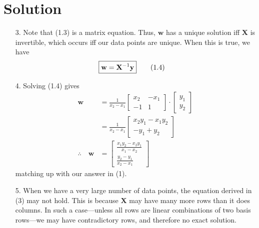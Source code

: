 \documentclass{harvardml}
\theoremstyle{definition}
\theoremstyle{plain}
\newenvironment{solution}
  {\color{blue}\section*{Solution}}
{}
\begin{document}
\begin{solution}
\begin{enumerate}
    \item[3.] Note that (1.3) is a matrix equation. Thus, $\mathbf{w}$ has a unique solution iff $\mathbf{X}$ is invertible, which occurs iff our data points are unique. When this is true, we have
    \begin{align*}
        \Aboxed{ \mathbf{w} &= \mathbf{X}^{-1} \mathbf{y} } \tag*{(1.4)}
    \end{align*}


    \item[4.] Solving (1.4) gives
    \begin{align*}
        \mathbf{w} &= \frac{1}{x_2 - x_1} \begin{bmatrix}
            x_2 & -x_1 \\
            -1 & 1
        \end{bmatrix} \cdot \begin{bmatrix}
            y_1 \\
            y_2
        \end{bmatrix} \\
        &= \frac{1}{x_2 - x_1} \begin{bmatrix}
            x_2y_1 -x_1y_2 \\
            -y_1 + y_2
        \end{bmatrix} \\
        \therefore \quad \mathbf{w} &= \begin{bmatrix}
            \frac{ x_1y_2 - x_2y_1 }{x_1 - x_2} \\
            \frac{y_2 - y_1}{x_2 - x_1}
        \end{bmatrix}
    \end{align*}
    matching up with our answer in (1).


    \item[5.] When we have a very large number of data points, the equation derived in (3) may not hold. This is because $\mathbf{X}$ may have many more rows than it does columns. In such a case---unless all rows are linear combinations of two basis rows---we may have contradictory rows, and therefore no exact solution.
\end{enumerate}

\end{solution}

\color{black}
\newpage
\end{document}
